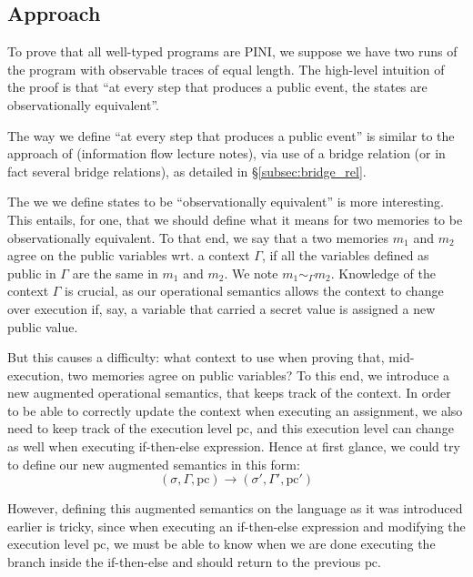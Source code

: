 \documentclass[10pt]{article}
\newcommand{\pc}{\mathrm{pc}}
\newcommand{\ctx}{\Gamma}
\newcommand{\agree}[3]{#2 \sim_{#1} #3}
\begin{document}
\subsection{Approach}%
\label{subsec:approach}

To prove that all well-typed programs are PINI, we suppose we have two runs of the program with observable traces of equal length. The high-level intuition of the proof is that ``at every step that produces a public event, the states are observationally equivalent''.

The way we define ``at every step that produces a public event'' is similar to the approach of (information flow lecture notes), via use of a bridge relation (or in fact several bridge relations), as detailed in \S\ref{subsec:bridge_rel}.

The we we define states to be ``observationally equivalent'' is more interesting. This entails, for one, that we should define what it means for two memories to be observationally equivalent. To that end, 
we say that a two memories $m_{1}$ and $m_{2}$ agree on the public variables wrt. a context $\ctx$,
if all the variables defined as public in $\ctx$ are the same in $m_{1}$ and $m_{2}$. We note
$\agree{\ctx}{m_{1}}{m_{2}}$. Knowledge of the context \( \ctx \) is crucial, as our operational semantics allows the context to change over execution if, say, a variable that carried a secret value is assigned a new public value.

But this causes a difficulty: what context to use when proving that, mid-execution, two memories agree on public variables? To this end, we introduce a new augmented operational semantics, that keeps track of the context. In order to be able to correctly update the context when executing an assignment, we also need to keep track of the execution level \( \pc \), and this execution level can change as well when executing if-then-else expression. Hence at first glance, we could try to define our new augmented semantics in this form:
\[ (\sigma, \ctx, \pc) \to (\sigma', \ctx', \pc') \]

However, defining this augmented semantics on the language as it was introduced earlier is tricky, since when executing an if-then-else expression and modifying the execution level \( \pc \), we must be able to know when we are done executing the branch inside the if-then-else and should return to the previous \( \pc \).
\end{document}
